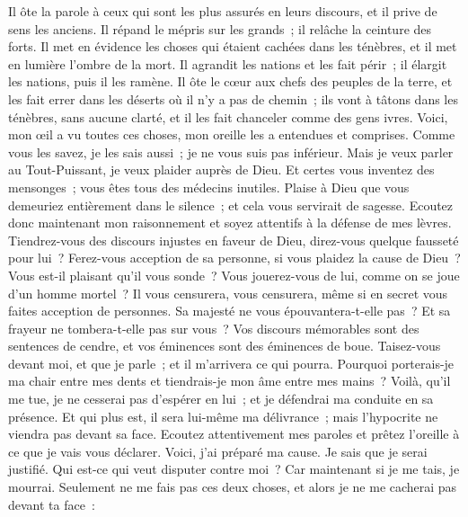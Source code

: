 \begin{multicols}{2}
Il ôte la parole à ceux qui sont les plus assurés en leurs discours, et il prive de sens les anciens.
Il répand le mépris sur les grands~; il relâche la ceinture des forts.
Il met en évidence les choses qui étaient cachées dans les ténèbres, et il met en lumière l'ombre de la mort.
 Il agrandit les nations et les fait périr~; il élargit les nations, puis il les ramène. 
Il ôte le cœur aux chefs des peuples de la terre, et les fait errer dans les déserts où il n'y a pas de chemin~;
ils vont à tâtons dans les ténèbres, sans aucune clarté, et il les fait chanceler comme des gens ivres. 
\VerseOne{}Voici, mon œil a vu toutes ces choses, mon oreille les a entendues et comprises.
Comme vous les savez, je les sais aussi~; je ne vous suis pas inférieur. 
Mais je veux parler au Tout-Puissant, je veux plaider auprès de Dieu.
Et certes vous inventez des mensonges~; vous êtes tous des médecins inutiles.
Plaise à Dieu que vous demeuriez entièrement dans le silence~; et cela vous servirait de sagesse.
Ecoutez donc maintenant mon raisonnement et soyez attentifs à la défense de mes lèvres.
Tiendrez-vous des discours injustes en faveur de Dieu, direz-vous quelque fausseté pour lui~? 
Ferez-vous acception de sa personne, si vous plaidez la cause de Dieu~? 
Vous est-il plaisant qu'il vous sonde~? Vous jouerez-vous de lui, comme on se joue d'un homme mortel~? 
Il vous censurera, vous censurera, même si en secret vous faites acception de personnes.
Sa majesté ne vous épouvantera-t-elle pas~? Et sa frayeur ne tombera-t-elle pas sur vous~? 
Vos discours mémorables sont des sentences de cendre, et vos éminences sont des éminences de boue. 
Taisez-vous devant moi, et que je parle~; et il m'arrivera ce qui pourra. 
Pourquoi porterais-je ma chair entre mes dents et tiendrais-je mon âme entre mes mains~?
Voilà, qu'il me tue, je ne cesserai pas d'espérer en lui~; et je défendrai ma conduite en sa présence.
Et qui plus est, il sera lui-même ma délivrance~; mais l'hypocrite ne viendra pas devant sa face.
Ecoutez attentivement mes paroles et prêtez l'oreille à ce que je vais vous déclarer. 
Voici, j'ai préparé ma cause. Je sais que je serai justifié.
Qui est-ce qui veut disputer contre moi~? Car maintenant si je me tais, je mourrai. 
Seulement ne me fais pas ces deux choses, et alors je ne me cacherai pas devant ta face~:

\end{multicols}
